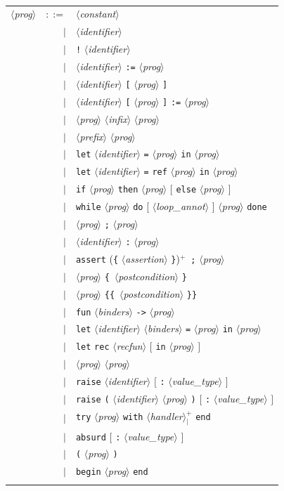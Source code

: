 \documentclass[a4paper,12pt]{report}
\makeatletter
\newcommand{\te}[1]{\texttt{#1}}
\newcommand{\nt}[1]{$\langle$\textsl{#1}$\rangle$}
\newcommand{\indexnt}[1]{\index{#1@\textsl{#1}, grammar entry}}
\newcommand{\indextt}[1]{\index{#1@\texttt{#1}}}
\newcommand{\plus}{$^+$}
\newcommand{\plussep}[1]{$^+_#1$}
\makeatother
\begin{document}
\begin{figure}[htbp]
\begin{center}
\hrulefill\\
\begin{tabular}{lrl}
  \nt{prog}\indexnt{prog}
    & $::=$ & \nt{constant} \\
      & $|$ & \nt{identifier} \\
      & $|$ & \te{!} \nt{identifier} \\
      & $|$ & \nt{identifier} \te{:=} \nt{prog} \\
      & $|$ & \nt{identifier} \te{[} \nt{prog} \te{]} \\
      & $|$ & \nt{identifier} \te{[} \nt{prog} \te{]} \te{:=} \nt{prog} \\
      & $|$ & \nt{prog} \nt{infix} \nt{prog} \\
      & $|$ & \nt{prefix} \nt{prog} \\
      & $|$ & \te{let} \nt{identifier} \te{=} \nt{prog} 
              \te{in} \nt{prog} \\
      & $|$ & \te{let} \nt{identifier} \te{=} \te{ref} 
              \nt{prog} \te{in} \nt{prog} \\
      & $|$ & \te{if} \nt{prog} \te{then} \nt{prog}
              $[$ \te{else} \nt{prog} $]$ \\
      & $|$ & \te{while} \nt{prog} \te{do}
              [ \nt{loop\_annot} ] \nt{prog} \te{done} \\
      & $|$ & \nt{prog} \te{;} \nt{prog} \\
      & $|$ & \nt{identifier} \te{:} \nt{prog} \\
      & $|$ & \te{assert} (\te{\{} \nt{assertion} \te{\}})\plus\
              \te{;} \nt{prog} \\
      & $|$ & \nt{prog} \te{\{}\ \nt{postcondition} \te{\}} \\
      & $|$ & \nt{prog} \te{\{\{}\ \nt{postcondition} \te{\}\}} \\
      & $|$ & \te{fun} \nt{binders} \te{->} \nt{prog} \\
      & $|$ & \te{let} \nt{identifier} \nt{binders} \te{=} \nt{prog} 
              \te{in} \nt{prog} \\
      & $|$ & \te{let} \te{rec} \nt{recfun} $[$ \te{in} \nt{prog} $]$ \\
      & $|$ & \nt{prog} \nt{prog} \\
      & $|$ & \te{raise} \nt{identifier} $[$ \te{:} \nt{value\_type} $]$ \\
      & $|$ & \te{raise} \te{(} \nt{identifier} \nt{prog} \te{)}
              $[$ \te{:} \nt{value\_type} $]$ \\
      & $|$ & \te{try} \nt{prog} \te{with} 
              \nt{handler}\plussep{\te{|}} \te{end} \\
      & $|$ & \te{absurd} $[$ \te{:} \nt{value\_type} $]$ \\ \indextt{absurd}
      & $|$ & \te{(} \nt{prog} \te{)} \\
      & $|$ & \te{begin} \nt{prog} \te{end} \\
  \\[0.1em]


\end{tabular}
\end{center}
\end{figure}
\end{document}
